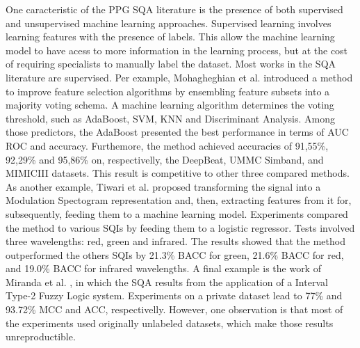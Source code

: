 One caracteristic of the \gls{PPG} \gls{SQA} literature is the presence of both supervised and unsupervised machine learning approaches. Supervised learning involves learning features with the presence of labels. This allow the machine learning model to have acess to more information in the learning process, but at the cost of requiring specialists to manually label the dataset. Most works in the \gls{SQA} literature are supervised. Per example, Mohagheghian et al. \cite{ppg-sqa-1} introduced a method to improve feature selection algorithms by ensembling feature subsets into a majority voting schema. A machine learning algorithm determines the voting threshold, such as AdaBoost, \gls{SVM}, KNN and Discriminant Analysis. Among those predictors, the AdaBoost presented the best performance in terms of \gls{AUC} \gls{ROC} and accuracy. Furthemore, the method achieved accuracies of 91,55\%, 92,29\% and 95,86\% on, respectivelly, the DeepBeat, UMMC Simband, and MIMICIII datasets. This result is competitive to other three compared methods. As another example, Tiwari et al. \cite{ppg-sqa-2} proposed transforming the signal into a Modulation Spectogram representation and, then, extracting features from it for, subsequently, feeding them to a machine learning model. Experiments compared the method to various \glspl{SQI} by feeding them to a logistic regressor. Tests involved three wavelengths: red, green and infrared. The results showed that the method outperformed the others \glspl{SQI} by 21.3\% \gls{BACC} for green, 21.6\% \gls{BACC} for red, and 19.0\% \gls{BACC} for infrared wavelengths. A final example is the work of Miranda et al. \cite{ppg-sqa-3}, in which the \gls{SQA} results from the application of a Interval Type-2 Fuzzy Logic system. Experiments on a private dataset lead to 77\% and 93.72\% \gls{MCC} and \gls{ACC}, respectivelly. However, one observation is that most of the experiments used originally unlabeled datasets, which make those results unreproductible. 
	
